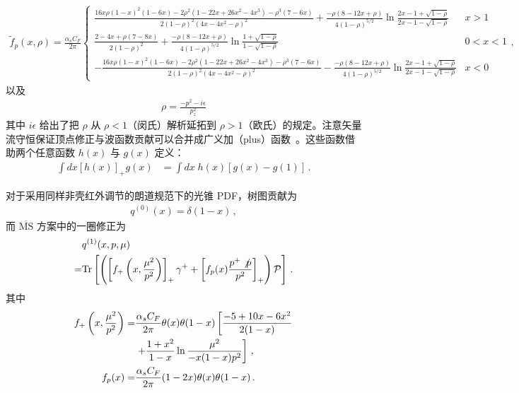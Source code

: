 \begin{align}
\widetilde{f}_p(x,\rho)=\frac{\alpha_s C_F}{2\pi}\left\{
\begin{array}{lc}
\frac{16x\rho(1-x)^2(1-6x)-2\rho^2(1-22x+26x^2-4x^3)-\rho^3(7-6x)}{2(1-\rho)^2(4x-4x^2-\rho)^2}+\frac{-\rho(8-12x+\rho)}{4(1-\rho)^{5/2}}\ln\frac{2x-1+\sqrt{1-\rho}}{2x-1-\sqrt{1-\rho}} & x>1\\
\frac{2-4x+\rho(7-8x)}{2(1-\rho)^2}+\frac{-\rho(8-12x+\rho)}{4(1-\rho)^{5/2}}\ln\frac{1+\sqrt{1-\rho}}{1-\sqrt{1-\rho}} & 0<x<1\\
-\frac{16x\rho(1-x)^2(1-6x)-2\rho^2(1-22x+26x^2-4x^3)-\rho^3(7-6x)}{2(1-\rho)^2(4x-4x^2-\rho)^2}-\frac{-\rho(8-12x+\rho)}{4(1-\rho)^{5/2}}\ln\frac{2x-1+\sqrt{1-\rho}}{2x-1-\sqrt{1-\rho}} & x<0
\end{array}\right.,
\end{align}
以及
\begin{align}
\rho=\frac{-p^2-i\epsilon}{p_z^2}
\end{align}
其中 $i\epsilon$ 给出了把 $\rho$ 从 $\rho<1$（闵氏）解析延拓到 $\rho>1$（欧氏）的规定。注意矢量流守恒保证顶点修正与波函数贡献可以合并成广义加（plus）函数~\cite{Stewart:2017tvs}。这些函数借助两个任意函数 $h(x)$ 与 $g(x)$ 定义：
\begin{align}
\int dx\left[{h(x)}\right]_+ g(x)&=\int dx\;h(x)\left[g(x)-g(1)\right]\,.
\end{align}

对于采用同样非壳红外调节的朗道规范下的光锥 PDF，树图贡献为
\begin{align}
q^{(0)}(x)=\delta(1-x)\,,
\end{align}
而 $\overline{\text{MS}}$ 方案中的一圈修正为
\begin{align}\label{eq:one_loop_lightconePDF}
&q^{(1)}(x,p,\mu)\nonumber\\
=&\mbox{Tr}\left[\left(\left[f_+\left(x,\frac{\mu^2}{p^2}\right)\right]_+\gamma^++\left[f_p(x)\frac{p^+\not{p}}{p^2}\right]_+\right) {\cal P}\right]\,.
\end{align}
其中
\begin{align}
f_+\left(x,\frac{\mu^2}{p^2}\right)=&\frac{\alpha_s C_F}{2\pi}\theta(x)\theta(1-x)\left[
\frac{-5+10x-6x^2}{2(1-x)}\right.\nonumber\\
&\left.+\frac{1+x^2}{1-x}\ln\frac{\mu^2}{-x(1-x)p^2}\right]\,, \\
f_p(x)=&\frac{\alpha_s C_F}{2\pi}(1-2x)\theta(x)\theta(1-x)\,.
\end{align}

